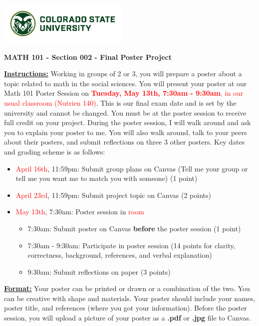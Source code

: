 \documentclass[12pt]{article}
\begin{document}
\includegraphics{CSUSig}

\begin{center}
    {\large\textbf{MATH 101 - Section 002 - Final Poster Project}}
\end{center}
\textbf{\underline{Instructions:}} Working in groups of 2 or 3, you will prepare a poster about a topic related to math in the social sciences. You will present your poster at our Math 101 Poster Session on \textcolor{red}{\textbf{Tuesday, May 13th, 7:30am - 9:30am}, in our usual classroom (Nutrien 140)}. This is our final exam date and is set by the university and cannot be changed.  You must be at the poster session to receive full credit on your project. During the poster session, I will walk around and ask you to explain your poster to me. You will also walk around, talk to your peers about their posters, and submit reflections on three 3 other posters. Key dates and grading scheme is as follows:

\begin{itemize}
    \item \textcolor{red}{April 16th}, 11:59pm: Submit group plans on Canvas (Tell me your group or tell me you want me to match you with someone) (1 point)
    \item \textcolor{red}{April 23rd}, 11:59pm: Submit project topic on Canvas (2 points)
    \item \textcolor{red}{May 13th}, 7:30am: Poster session in \textcolor{red}{room}
        \begin{itemize}
            \item 7:30am: Submit poster on Canvas \textbf{before} the poster session (1 point)
            \item 7:30am - 9:30am: Participate in poster session (14 points for clarity, correctness, background, references, and verbal explanation)
             \item 9:30am: Submit reflections on paper (3 points)
             \end{itemize}
\end{itemize}

\textbf{\underline{Format:}} Your poster can be printed or drawn or a combination of the two. You can be creative with shape and materials. Your poster should include your names, poster title, and references (where you got your information). Before the poster session, you will upload a picture of your poster as a \textbf{.pdf} or \textbf{.jpg} file to Canvas. 
\end{document}
